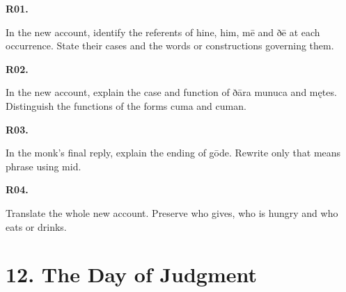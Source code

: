 \par\begin{minipage}{\linewidth}\raggedright
\textbf{R01.}

In the new account, identify the referents of hine, him, mē and ðē at each occurrence. State their cases and the words or constructions governing them.

\end{minipage}\par\addvspace{4pt}

\par\begin{minipage}{\linewidth}\raggedright
\textbf{R02.}

In the new account, explain the case and function of ðāra munuca and mętes. Distinguish the functions of the forms cuma and cuman.

\end{minipage}\par\addvspace{4pt}

\par\begin{minipage}{\linewidth}\raggedright
\textbf{R03.}

In the monk’s final reply, explain the ending of gōde. Rewrite only that means phrase using mid.

\end{minipage}\par\addvspace{4pt}

\par\begin{minipage}{\linewidth}\raggedright
\textbf{R04.}

Translate the whole new account. Preserve who gives, who is hungry and who eats or drinks.

\end{minipage}\par\addvspace{4pt}

\section*{12. The Day of Judgment}

